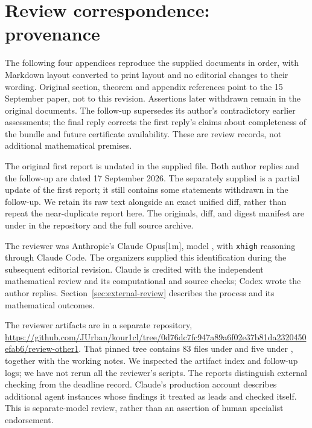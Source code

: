 \clearpage
\section{Review correspondence: provenance}
\label{app:review-provenance}
The following four appendices reproduce the supplied documents in order,
with Markdown layout converted to print layout and no editorial changes
to their wording. Original section, theorem and appendix references point
to the 15 September paper, not to this revision. Assertions later withdrawn
remain in the original documents. The follow-up supersedes its author's
contradictory earlier assessments; the final reply corrects the first reply's
claims about completeness of the bundle and future certificate availability.
These are review records, not additional mathematical premises.

The original first report is undated in the supplied file. Both author
replies and the follow-up are dated 17 September 2026. The separately
supplied  is a partial update of the first report;
it still contains some statements withdrawn in the follow-up. We retain its
raw text alongside an exact unified diff, rather than repeat the near-duplicate
report here. The originals, diff, and digest manifest are under
 in the repository and the full source archive.

The reviewer was Anthropic's Claude Opus[1m], model
, with \texttt{xhigh} reasoning through
Claude Code. The organizers supplied this identification during the
subsequent editorial revision. Claude is credited with the independent
mathematical review and its computational and source checks; Codex wrote
the author replies. Section~\ref{sec:external-review} describes the process
and its mathematical outcomes.

The reviewer artifacts are in a separate repository,
\url{https://github.com/JUrban/kour1cl/tree/0d76dc7fc947a89a6f02e37b81da2320450efab6/review-other1}.
That pinned tree contains 83 files under  and five under
, together with the working notes. We inspected the
artifact index and follow-up logs; we have not rerun all the reviewer's
scripts. The reports distinguish external checking from the deadline record.
Claude's production account describes additional agent instances whose
findings it treated as leads and checked itself. This is separate-model
review, rather than an assertion of human specialist endorsement.

